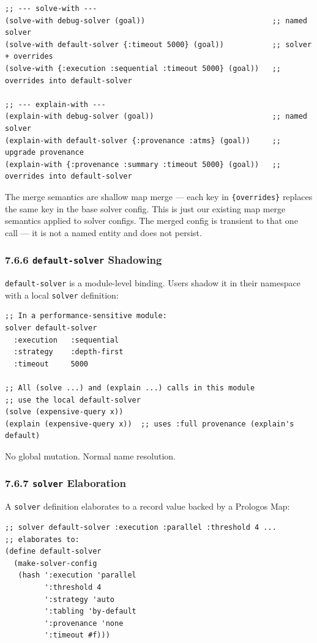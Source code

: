 \documentclass[11pt]{article}
\begin{document}
\begin{verbatim}
;; --- solve-with ---
(solve-with debug-solver (goal))                             ;; named solver
(solve-with default-solver {:timeout 5000} (goal))           ;; solver + overrides
(solve-with {:execution :sequential :timeout 5000} (goal))   ;; overrides into default-solver

;; --- explain-with ---
(explain-with debug-solver (goal))                           ;; named solver
(explain-with default-solver {:provenance :atms} (goal))     ;; upgrade provenance
(explain-with {:provenance :summary :timeout 5000} (goal))   ;; overrides into default-solver
\end{verbatim}

The merge semantics are shallow map merge — each key in \texttt{\{overrides\}}
replaces the same key in the base solver config. This is just our existing
map merge semantics applied to solver configs. The merged config is transient
to that one call — it is not a named entity and does not persist.
\subsubsection{7.6.6 \texttt{default-solver} Shadowing}
\label{sec:org313267a}

\texttt{default-solver} is a module-level binding. Users shadow it in their
namespace with a local \texttt{solver} definition:

\begin{verbatim}
;; In a performance-sensitive module:
solver default-solver
  :execution   :sequential
  :strategy    :depth-first
  :timeout     5000

;; All (solve ...) and (explain ...) calls in this module
;; use the local default-solver
(solve (expensive-query x))
(explain (expensive-query x))  ;; uses :full provenance (explain's default)
\end{verbatim}

No global mutation. Normal name resolution.
\subsubsection{7.6.7 \texttt{solver} Elaboration}
\label{sec:orgc53753d}

A \texttt{solver} definition elaborates to a record value backed by a Prologos Map:

\begin{verbatim}
;; solver default-solver :execution :parallel :threshold 4 ...
;; elaborates to:
(define default-solver
  (make-solver-config
   (hash ':execution 'parallel
         ':threshold 4
         ':strategy 'auto
         ':tabling 'by-default
         ':provenance 'none
         ':timeout #f)))
\end{verbatim}
\end{document}
